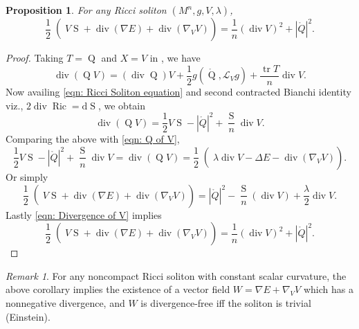 \documentclass{amsart}
\newcommand{\abs}[1]{\left| #1 \right|}
\newcommand{\lie}[1]{\mathcal{L}_{#1}}
\newcommand{\derivative}{\mathrm{d}}
\DeclareMathOperator*{\ricci}{Ric}
\DeclareMathOperator*{\Qricci}{Q}
\DeclareMathOperator*{\scalar}{S}
\DeclareMathOperator*{\divergence}{div}
\DeclareMathOperator*{\trace}{tr}
\theoremstyle{plain}
\newtheorem{proposition}{Proposition}
\theoremstyle{plain}
\theoremstyle{plain}
\theoremstyle{plain}
\theoremstyle{remark}
\newtheorem{remark}{Remark}
\begin{document}
\begin{proposition}\label{lapE}
    For any Ricci soliton  $(M^n,g, V, \lambda)$,      
   \begin{equation}\label{eqn: V scalar norm of traceless Ricci} 
        \left. \frac{1}{2} \middle( V\scalar + \divergence (\nabla E) + \divergence (\nabla_V V)  \right) 
            = \frac{1}{n} (\divergence V)^2 + \abs{\mathring{Q}}^2 .
    \end{equation}
\end{proposition}
\begin{proof}
	Taking $T=\Qricci$ and $X=V$ in , we have
    $$ \divergence (\Qricci V) = (\divergence \Qricci) V + \frac{1}{2}g\left(\mathring{\Qricci},\lie{V}g\right) + \frac{\trace T}{n} \divergence V . $$
    Now availing \cref{eqn: Ricci Soliton equation} and second contracted Bianchi identity viz., 
  $ 2  \divergence \ricci = \derivative \scalar $, we obtain
    $$ \divergence ( \Qricci V ) = \frac{1}{2} V\scalar - \abs{\mathring{Q}}^2 + \frac{\scalar}{n} \divergence V .  $$
    Comparing the above with \cref{eqn: Q of V},
    \begin{equation*}
        \frac{1}{2} V\scalar - \abs{\mathring{Q}}^2 + \frac{\scalar}{n} \divergence V 
        		= \divergence (\Qricci V) 
            = \left. \frac{1}{2} \middle( \lambda \divergence V   - \Delta E - \divergence (\nabla_V V)\right). 
    \end{equation*}
    Or simply
    \begin{equation}\label{div E}
        \left. \frac{1}{2} \middle( V\scalar + \divergence (\nabla E) + \divergence (\nabla_V V)  \right) 
            = \abs{\mathring{Q}}^2 - \frac{\scalar}{n} (\divergence V) + \frac{\lambda}{2} \divergence V .
    \end{equation}
    Lastly \cref{eqn: Divergence of V} implies
    \begin{equation*}
        \left. \frac{1}{2} \middle( V\scalar + \divergence (\nabla E) + \divergence (\nabla_V V)  \right) 
            = \frac{1}{n} (\divergence V)^2 + \abs{\mathring{Q}}^2 .
    \end{equation*}
\end{proof}

\begin{remark}
    For any noncompact Ricci soliton with constant scalar curvature, the above corollary implies the existence of a vector field $W = \nabla E + \nabla_V V $ which has a nonnegative divergence, and $W$ is divergence-free iff the  soliton is trivial (Einstein).
\end{remark}
\end{document}
